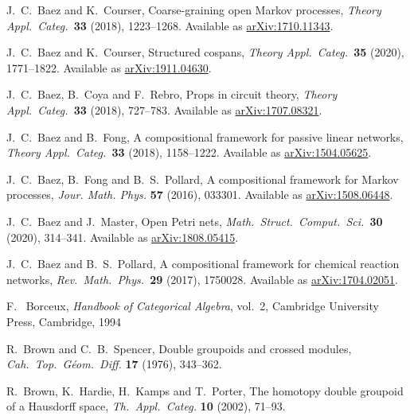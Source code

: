 \documentclass[reqno]{amsart}
\begin{document}
\begin{thebibliography}{100}

 J.\ C.\ Baez and K.\ Courser, Coarse-graining open Markov processes, \textsl{Theory Appl.\ Categ.\ }\textbf{33} (2018), 1223--1268.  Available as \href{https://arxiv.org/abs/1710.11343}{arXiv:1710.11343}.

 J.\ C.\ Baez and K.\ Courser, Structured cospans,  \textsl{Theory Appl.\ Categ.\ }\textbf{35} (2020), 1771–1822.   Available as \href{http://arxiv.org/abs/1911.04630}{arXiv:1911.04630}.

 J.\ C.\ Baez, B.\ Coya and F.\ Rebro, Props in circuit theory, \textsl{Theory Appl.\ Categ.\ }\textbf{33} (2018), 727--783.    Available as \href{https://arxiv.org/abs/1707.08321}{arXiv:1707.08321}. 

  J.\ C.\ Baez and B.\ Fong, A compositional framework for passive linear networks, \textsl{Theory Appl.\ Categ.\ }\textbf{33} (2018), 1158--1222.  Available as \href{http://arxiv.org/abs/1504.05625}{arXiv:1504.05625}.

 J.\ C.\ Baez, B.\ Fong and B.\ S.\ Pollard, A compositional framework for Markov processes, \textsl{Jour. Math. Phys.} \textbf{57} (2016), 033301. Available as \href{http://arxiv.org/abs/1508.06448}{arXiv:1508.06448}.

  J.\ C.\ Baez and J.\ Master, Open Petri nets, \textsl{Math.\ Struct.\ Comput.\ Sci.\ }\textbf{30} (2020), 314--341. Available as 
\href{https://arxiv.org/abs/1808.05415}{arXiv:1808.05415}. 

 J.\ C.\ Baez and B.\ S.\ Pollard, A compositional framework for chemical reaction networks, \textsl{Rev.\ Math.\ Phys.\ }\textbf{29} (2017), 1750028.  Available as \href{http://arxiv.org/abs/1704.02051}{arXiv:1704.02051}.

 F. \ Borceux, \textsl{Handbook of Categorical Algebra}, vol.\ 2, 
Cambridge University Press, Cambridge, 1994

 R.\ Brown and C.\ B.\ Spencer, Double groupoids and crossed modules, 
\textsl{Cah.\ Top.\ G\'eom.\ Diff.} \textbf{17} (1976), 343--362.

 R.\ Brown, K.\ Hardie, H.\ Kamps and T.\ Porter, The homotopy double groupoid of a Hausdorff space, \textsl{Th.\ Appl.\ Categ.} \textbf{10} (2002), 71--93.



\end{thebibliography}
\end{document}
